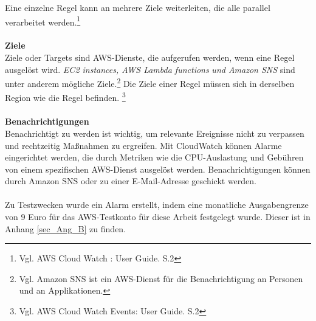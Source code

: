 Eine einzelne Regel kann an mehrere Ziele weiterleiten, die alle parallel verarbeitet werden.\footnote{Vgl. AWS Cloud Watch : User Guide. S.2\cite{AMZ13}}
\\\\
\textbf{Ziele} \\
Ziele oder Targets sind AWS-Dienste, die aufgerufen werden, wenn eine Regel ausgelöst wird.
\textit{EC2 instances, AWS Lambda functions} \textit{und Amazon SNS} sind unter anderem mögliche Ziele.\footnote{Vgl. Amazon SNS ist ein AWS-Dienst für die Benachrichtigung an Personen und an Applikationen.\cite{AMZ30}}
Die Ziele einer Regel müssen sich in derselben Region wie die Regel befinden.
\footnote{Vgl. AWS Cloud Watch Events: User Guide. S.2\cite{AMZ13}}
\\\\
\textbf{Benachrichtigungen}\\
Benachrichtigt zu werden ist wichtig, um relevante Ereignisse nicht zu verpassen und rechtzeitig Maßnahmen zu ergreifen. Mit CloudWatch können Alarme eingerichtet werden, die durch Metriken wie die CPU-Auslastung und Gebühren von einem spezifischen AWS-Dienst ausgelöst werden. Benachrichtigungen können durch Amazon SNS oder zu einer E-Mail-Adresse geschickt werden.
\\\\
Zu Testzwecken wurde ein Alarm erstellt, indem eine monatliche Ausgabengrenze von 9 Euro für das AWS-Testkonto für diese Arbeit festgelegt wurde. Dieser ist in Anhang \ref{sec_Ang_B} zu finden.
